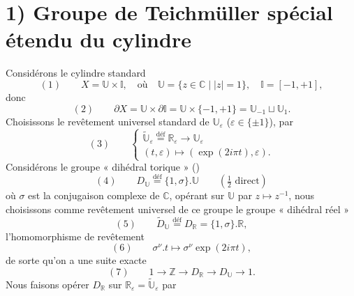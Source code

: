 \documentclass[11pt,a4paper]{article}
\begin{document}
\section{1) Groupe de Teichmüller spécial étendu du cylindre}

Considérons le cylindre standard
\[
(1)\qquad X = \mathbb{U}\times\mathbb{I}, \quad\text{où}\quad
\mathbb{U}=\{z\in\mathbb{C} \mid |z|=1\},\quad \mathbb{I}=[-1,+1],
\]
donc
\[
(2)\qquad \partial X = \mathbb{U}\times\partial\mathbb{I}
= \mathbb{U}\times\{-1,+1\} = \mathbb{U}_{-1}\sqcup\mathbb{U}_{1}.
\]
Choisissons le revêtement universel standard de $\mathbb{U}_\varepsilon$ ($\varepsilon\in\{\pm1\}$), par
\[
(3)\qquad
\begin{cases}
\widetilde{\mathbb{U}}_\varepsilon \overset{\text{déf}}{=} \mathbb{R}_\varepsilon \longrightarrow \mathbb{U}_\varepsilon\\
(t,\varepsilon)\longmapsto (\exp(2i\pi t),\varepsilon).
\end{cases}
\]
Considérons le groupe « dihédral torique » ()
\[
(4)\qquad D_{\mathbb{U}} \overset{\text{déf}}{=} \{1,\sigma\}.\mathbb{U}\qquad(\tfrac12\text{ direct})
\]
où $\sigma$ est la conjugaison complexe de $\mathbb{C}$, opérant sur $\mathbb{U}$ par $z\mapsto z^{-1}$, nous choisissons comme revêtement universel de ce groupe le groupe « dihédral réel »
\[
(5)\qquad \widetilde{D}_{\mathbb{U}} \overset{\text{déf}}{=} D_{\mathbb{R}} = \{1,\sigma\}.\mathbb{R},
\]
 l'homomorphisme de revêtement
\[
(6)\qquad \sigma^\nu.t \longmapsto \sigma^\nu \exp(2i\pi t),
\]
de sorte qu'on a une suite exacte
\[
(7)\qquad 1\longrightarrow\mathbb{Z}\longrightarrow D_{\mathbb{R}}\longrightarrow D_{\mathbb{U}}\longrightarrow 1.
\]
Nous faisons opérer $D_{\mathbb{R}}$ sur $\mathbb{R}_\varepsilon=\widetilde{\mathbb{U}}_\varepsilon$ par
\end{document}
